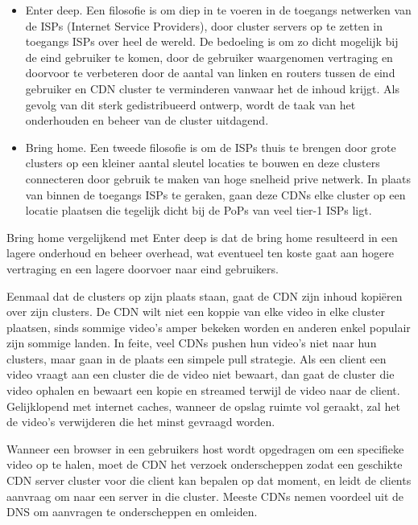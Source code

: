 \begin{itemize}
   \item Enter deep. Een filosofie is om diep in te voeren in de toegangs netwerken van de ISPs (Internet Service Providers), door cluster servers op te zetten in toegangs ISPs over heel de wereld. De bedoeling is om zo dicht mogelijk bij de eind gebruiker te komen, door de gebruiker waargenomen vertraging en doorvoor te verbeteren door de aantal van linken en routers tussen de eind gebruiker en CDN cluster te verminderen vanwaar het de inhoud krijgt. Als gevolg van dit sterk gedistribueerd ontwerp, wordt de taak van het onderhouden en beheer van de cluster uitdagend.
 \item Bring home. Een tweede filosofie is om de ISPs thuis te brengen door grote clusters op een kleiner aantal sleutel locaties te bouwen en deze clusters connecteren door gebruik te maken van hoge snelheid prive netwerk. In plaats van binnen de toegangs ISPs te geraken, gaan deze CDNs  elke cluster op een locatie plaatsen die tegelijk dicht bij de PoPs van veel tier-1 ISPs ligt.
\end{itemize}


Bring home vergelijkend met Enter deep is dat de bring home resulteerd in een lagere onderhoud en beheer overhead, wat eventueel ten koste gaat aan hogere vertraging en een lagere doorvoer naar eind gebruikers.

Eenmaal dat de clusters op zijn plaats staan, gaat de CDN zijn inhoud kopiëren over zijn clusters. De CDN wilt niet een koppie van elke video in elke cluster plaatsen, sinds sommige video’s amper bekeken worden en anderen enkel populair zijn sommige landen. In feite, veel CDNs pushen hun video’s niet naar hun clusters, maar gaan in de plaats een simpele pull strategie. Als een client een video vraagt aan een cluster die de video niet bewaart, dan gaat de cluster die video ophalen en bewaart een kopie en streamed terwijl de video naar de client. Gelijklopend met internet caches, wanneer de opslag ruimte vol geraakt, zal het de video’s verwijderen die het minst gevraagd worden.


Wanneer  een browser in een gebruikers host wordt opgedragen om een specifieke video op te halen, moet de CDN het verzoek onderscheppen zodat een geschikte CDN server cluster voor die client kan bepalen op dat moment, en leidt de clients aanvraag om naar een server in die cluster.
Meeste CDNs nemen voordeel uit de DNS om aanvragen te onderscheppen en omleiden.

